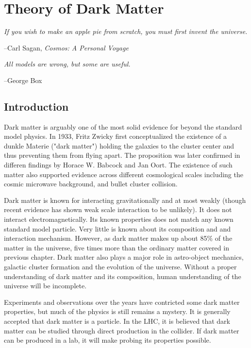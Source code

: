 \chapter{Theory of Dark Matter}

	

\epigraph{\textit{If you wish to make an apple pie from scratch, you must first invent the universe.}}{--Carl Sagan, \textit{Cosmos: A Personal Voyage}}
\epigraph{\textit{All models are wrong, but some are useful.}}{--George Box}


\section{Introduction}
Dark matter is arguably one of the most solid evidence for beyond the standard model physics. In 1933, Fritz Zwicky first conceptualized the existence of a dunkle Materie ("dark matter") holding the galaxies to the cluster center and thus preventing them from flying apart. The proposition was later confirmed in differen findings by Horace W. Babcock and Jan Oort. The existence of such matter also supported evidence across different cosmological scales including the cosmic
microwave background, and bullet cluster collision.

Dark matter is known for interacting gravitationally and at most weakly (though recent evidence has shown weak scale interaction to be unlikely). It does not interact electromagnetically. Its known properties does not match any known standard model particle. Very little is known about its composition and and interaction mechanism. However, as dark matter makes up about 85\% of the matter in the universe, five times more than the ordinary matter covered in previous chapter. Dark matter also plays a major role in astro-object mechanics, galactic cluster formation and the evolution of the universe. Without a proper understanding of dark matter and its composition, human understanding of the universe will be incomplete.

Experiments and observations over the years have contricted some dark matter properties, but much of the physics is still remains a mystery. It is generally accepted that dark matter is a particle. In the LHC, it is believed that dark matter can be studied through direct production in the collider. If dark matter can be produced in a lab, it will make probing its properties possible. 

